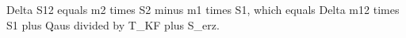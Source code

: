 Delta S12 equals m2 times S2 minus m1 times S1, which equals Delta m12 times S1 plus Qaus divided by T_KF plus S_erz.
